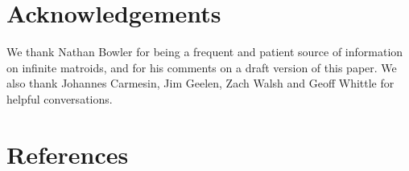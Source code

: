 \documentclass{amsart}
\theoremstyle{plain}
\theoremstyle{definition}
\DeclareMathOperator{\cl}{cl}
\newcommand{\con}{/}
\renewcommand{\ss}{\subseteq}
\begin{document}
  
  
  
  





\section*{Acknowledgements}
We thank Nathan Bowler for being a frequent and patient source of information on infinite matroids, and 
for his comments on a draft version of this paper. We also thank 
Johannes Carmesin, Jim Geelen, Zach Walsh and Geoff Whittle for helpful conversations. 

\section*{References}
\end{document}
